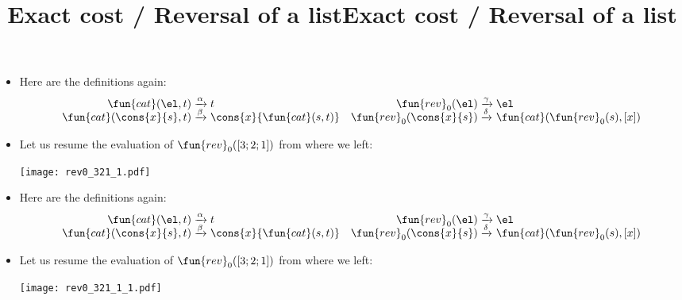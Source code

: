 \documentclass[wide]{slides}
\begin{document}
\begin{slide}
  \title{Exact cost / Reversal of a list}

  \begin{itemize}

    \item Here are the definitions again:
      \begin{equation*}
        \begin{array}{@{}r@{\;}l@{\;}lr@{\;}l@{\;}l@{}}
          \fun{cat}(\el,t)
          & \xrightarrow{\alpha} & t
          & \fun{rev}_0(\el)
          & \xrightarrow{\smash{\gamma}} & \el\\
          \fun{cat}(\cons{x}{s},t)
          & \xrightarrow{\smash{\beta}} & \cons{x}{\fun{cat}(s,t)}
          & \fun{rev}_0(\cons{x}{s})
          & \xrightarrow{\smash{\delta}} & \fun{cat}(\fun{rev}_0(s),[x])
        \end{array}
      \end{equation*}

      \item Let us resume the evaluation of \(\fun{rev}_0([3;2;1])\)
        from where we left:
        \begin{center}
          \texttt{[image: rev0\_321\_1.pdf]}
        \end{center}

  \end{itemize}

\end{slide}

\begin{slide}
  \title{Exact cost / Reversal of a list}

  \begin{itemize}

    \item Here are the definitions again:
      \begin{equation*}
        \begin{array}{@{}r@{\;}l@{\;}lr@{\;}l@{\;}l@{}}
          \fun{cat}(\el,t)
          & \xrightarrow{\alpha} & t
          & \fun{rev}_0(\el)
          & \xrightarrow{\smash{\gamma}} & \el\\
          \fun{cat}(\cons{x}{s},t)
          & \xrightarrow{\smash{\beta}} & \cons{x}{\fun{cat}(s,t)}
          & \fun{rev}_0(\cons{x}{s})
          & \xrightarrow{\smash{\delta}} & \fun{cat}(\fun{rev}_0(s),[x])
        \end{array}
      \end{equation*}

      \item Let us resume the evaluation of \(\fun{rev}_0([3;2;1])\)
        from where we left:
        \begin{center}
          \texttt{[image: rev0\_321\_1\_1.pdf]}
        \end{center}

  \end{itemize}

\end{slide}
\end{document}

